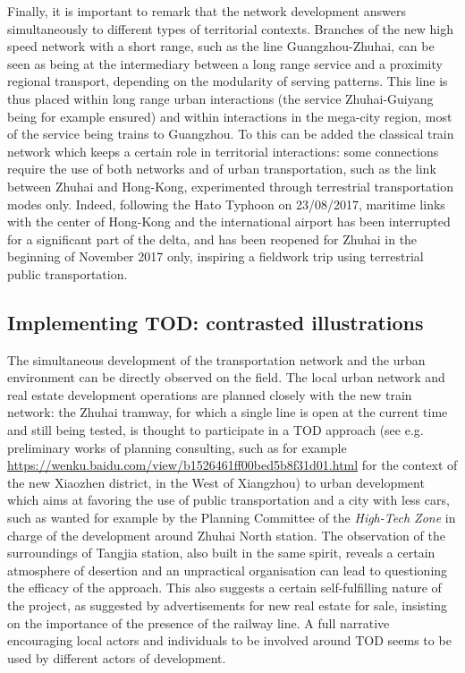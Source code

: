 \documentclass[11pt]{article}
\begin{document}
Finally, it is important to remark that the network development answers simultaneously to different types of territorial contexts. Branches of the new high speed network with a short range, such as the line Guangzhou-Zhuhai, can be seen as being at the intermediary between a long range service and a proximity regional transport, depending on the modularity of serving patterns. This line is thus placed within long range urban interactions (the service Zhuhai-Guiyang being for example ensured) and within interactions in the mega-city region, most of the service being trains to Guangzhou. To this can be added the classical train network which keeps a certain role in territorial interactions: some connections require the use of both networks and of urban transportation, such as the link between Zhuhai and Hong-Kong, experimented through terrestrial transportation modes only. Indeed, following the Hato Typhoon on 23/08/2017, maritime links with the center of Hong-Kong and the international airport has been interrupted for a significant part of the delta, and has been reopened for Zhuhai in the beginning of November 2017 only, inspiring a fieldwork trip using terrestrial public transportation.


\subsection{Implementing TOD: contrasted illustrations}

The simultaneous development of the transportation network and the urban environment can be directly observed on the field. The local urban network and real estate development operations are planned closely with the new train network: the Zhuhai tramway, for which a single line is open at the current time and still being tested, is thought to participate in a TOD approach (see e.g. preliminary works of planning consulting, such as for example \url{https://wenku.baidu.com/view/b1526461ff00bed5b8f31d01.html} for the context of the new Xiaozhen district, in the West of Xiangzhou) to urban development which aims at favoring the use of public transportation and a city with less cars, such as wanted for example by the Planning Committee of the \emph{High-Tech Zone} in charge of the development around Zhuhai North station. The observation of the surroundings of Tangjia station, also built in the same spirit, reveals a certain atmosphere of desertion and an unpractical organisation can lead to questioning the efficacy of the approach. This also suggests a certain self-fulfilling nature of the project, as suggested by advertisements for new real estate for sale, insisting on the importance of the presence of the railway line. A full narrative encouraging local actors and individuals to be involved around TOD seems to be used by different actors of development.
\end{document}
